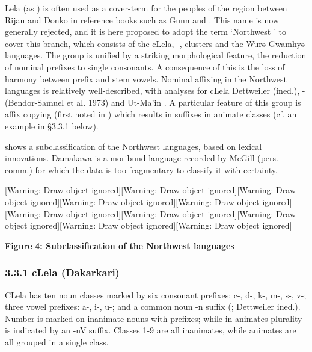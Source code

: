 \documentclass[output=paper]{langsci/langscibook}
\begin{document}
{Lela (as ) is often used as a cover-term for the peoples of the region between Rijau and Donko in reference books such as Gunn and \citet{Conant1960}. This name is now generally rejected, and it is here proposed to adopt the term ‘Northwest ’ to cover this branch, which consists of the cLela, -,  clusters and the Wurə-Gwamhyə- languages. The group is unified by a striking morphological feature, the reduction of nominal prefixes to single consonants. A consequence of this is the loss of harmony between prefix and stem vowels. Nominal affixing in the Northwest  languages is relatively well-described, with analyses for cLela Dettweiler (ined.), - (Bendor-Samuel} {et al.} {1973) and} {U}{t-Ma’in \citep{Patterson2012}. A particular feature of this group is affix copying (first noted in \citealt{Hoffmann1967}) which results in suffixes in animate classes (cf. an example in §3.3.1 below).}


 shows a subclassification of the Northwest  languages, based on lexical innovations. Damakawa is a moribund language recorded by McGill (pers. comm.) for which the data is too fragmentary to classify it with certainty.

[Warning: Draw object ignored][Warning: Draw object ignored][Warning: Draw object ignored][Warning: Draw object ignored][Warning: Draw object ignored][Warning: Draw object ignored][Warning: Draw object ignored][Warning: Draw object ignored][Warning: Draw object ignored][Warning: Draw object ignored]  
 


\textbf{{Figure} }\textbf{{4: Subclassification of the Northwest  languages}}



\subsubsection{3.3.1 cLela (Dakarkari)}

{CLela has ten noun classes marked by six consonant prefixes:} c-, d-, k-, m-, s-, v-{; three vowel prefixes:} a-, i-, u-{; and a common noun} {}-n {suffix (\citealt{Hoffmann1967}; Dettweiler ined.). Number is marked on inanimate nouns with prefixes; while in animates plurality is indicated by an -nV suffix. Classes 1-9 are all inanimates, while animates are all grouped in a single class.} 
\end{document}
